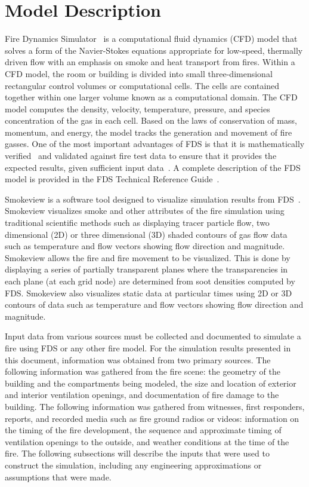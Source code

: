 \documentclass[12pt,oneside]{book}
\begin{document}
\chapter{Model Description}
\label{model}
Fire Dynamics Simulator~\cite{FDS_Users_Guide} is a computational fluid dynamics (CFD) model that solves a form of the Navier-Stokes equations appropriate for low-speed, thermally driven flow with an emphasis on smoke and heat transport from fires.  Within a CFD model, the room or building is divided into small three-dimensional rectangular control volumes or computational cells.  The cells are contained together within one larger volume known as a computational domain.  The CFD model computes the density, velocity, temperature, pressure, and species concentration of the gas in each cell.  Based on the laws of conservation of mass, momentum,  and energy, the model tracks the generation and movement of fire gasses. One of the most important advantages of FDS is that it is  mathematically verified~\cite{FDS_Verification_Guide} and validated against fire test data to ensure that it provides the expected results, given sufficient input data~\cite{FDS_Validation_Guide}.  A complete description of the FDS model is provided in the FDS Technical Reference Guide~\cite{FDS_Math_Guide}.

Smokeview is a software tool designed to visualize simulation results from FDS~\cite{Smokeview_Users_Guide}.  Smokeview visualizes smoke and other attributes of the fire simulation using traditional scientific methods such as displaying tracer particle flow, two dimensional (2D) or three dimensional (3D) shaded contours of gas flow data such as temperature and flow vectors showing flow direction and magnitude.  Smokeview allows the fire and fire movement to be visualized.  This is done by displaying a series of partially transparent planes where the transparencies in each plane (at each grid node) are determined from soot densities computed by FDS.  Smokeview also visualizes static data at particular times using 2D or 3D contours of data such as temperature and flow vectors showing flow direction and magnitude.

Input data from various sources must be collected and documented to simulate a fire using FDS or any other fire model. For the simulation results presented in this document, information was obtained from two primary sources. The following information was gathered from the fire scene: the geometry of the building and the compartments being modeled, the size and location of exterior and interior ventilation openings, and documentation of fire damage to the building. The following information was gathered from witnesses, first responders, reports, and recorded media such as fire ground radios or videos: information on the timing of the fire development, the sequence and approximate timing of ventilation openings to the outside, and weather conditions at the time of the fire. The following subsections will describe the inputs that were used to construct the simulation, including any engineering approximations or assumptions that were made.
\end{document}
